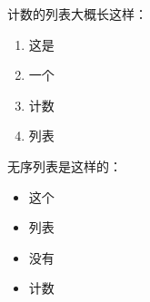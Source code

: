 \documentclass{ctexart}
\begin{document}
计数的列表大概长这样：
\begin{enumerate}
\item 这是
\item 一个
\item 计数
\item 列表
\end{enumerate}

无序列表是这样的：
\begin{itemize}
\item 这个
\item 列表
\item 没有
\item 计数
\end{itemize}
\end{document}
